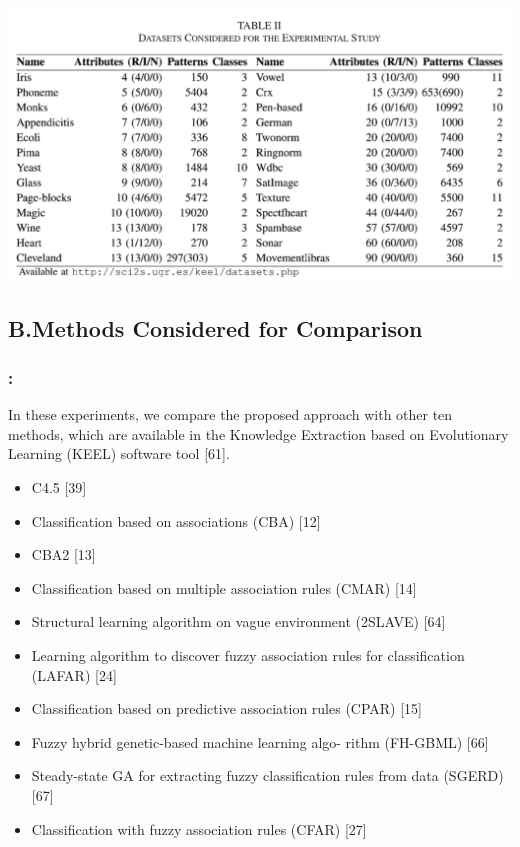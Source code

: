 \documentclass{beamer}
\begin{document}
\begin{CJK*}{UTF8}{bsmi}
\begin{frame}
	\begin{center}
		\includegraphics[height=.7\textheight]{./9.png}
	\end{center}
\end{frame}

\subsection{B.Methods Considered for Comparison}


\begin{frame}
	\frametitle{\insertsection : \insertsubsection}
	In these experiments, we compare the proposed approach with other ten methods, which are available in the Knowledge Extraction based on Evolutionary Learning (KEEL) software tool [61].
{\footnotesize 	\begin{itemize}
		\item C4.5 [39]
		\item Classification based on associations (CBA) [12]
		\item CBA2 [13]
		\item Classification based on multiple association rules (CMAR) [14]
		\item Structural learning algorithm on vague environment (2SLAVE) [64]
		\item Learning algorithm to discover fuzzy association rules for classification (LAFAR) [24]
		\item Classification based on predictive association rules (CPAR) [15]
		\item Fuzzy hybrid genetic-based machine learning algo- rithm (FH-GBML) [66]
		\item Steady-state GA for extracting fuzzy classification rules
from data (SGERD) [67]
		\item Classification with fuzzy association rules (CFAR) [27]
	\end{itemize}}
\end{frame}


\end{CJK*}
\end{document}
